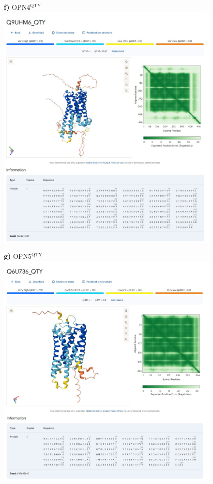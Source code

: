 \documentclass[fleqn,12pt]{supp}
\begin{document}
\newpage
\begin{figure}[H]
    \textbf{f)} OPN4$^{\textrm{QTY}}$ \\
    \includegraphics[width=\linewidth]{FigureS2f.jpg}
\end{figure}

\newpage
\begin{figure}[H]
    \textbf{g)} OPN5$^{\textrm{QTY}}$ \\
    \includegraphics[width=\linewidth]{FigureS2g.jpg}
\end{figure}
\end{document}
